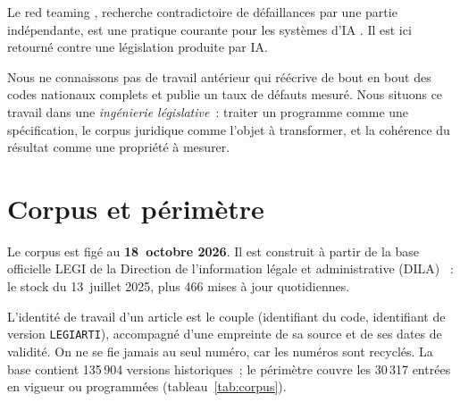 \documentclass[11pt,a4paper]{article}
\begin{document}
Le \og red teaming \fg{}, recherche contradictoire de défaillances par une partie indépendante, est une pratique courante pour les systèmes d'IA \cite{ganguli2022}. Il est ici retourné contre une législation produite par IA.

Nous ne connaissons pas de travail antérieur qui réécrive de bout en bout des codes nationaux complets et publie un taux de défauts mesuré. Nous situons ce travail dans une \emph{ingénierie législative}~: traiter un programme comme une spécification, le corpus juridique comme l'objet à transformer, et la cohérence du résultat comme une propriété à mesurer.

\section{Corpus et périmètre}
\label{sec:corpus}

Le corpus est figé au \textbf{18~octobre 2026}. Il est construit à partir de la base officielle LEGI de la Direction de l'information légale et administrative (DILA) \cite{legi}~: le stock du 13~juillet 2025, plus 466 mises à jour quotidiennes.

L'identité de travail d'un article est le couple (identifiant du code, identifiant de version \texttt{LEGIARTI}), accompagné d'une empreinte de sa source et de ses dates de validité. On ne se fie jamais au seul numéro, car les numéros sont recyclés. La base contient 135\,904 versions historiques~; le périmètre couvre les 30\,317 entrées en vigueur ou programmées (tableau~\ref{tab:corpus}).
\end{document}
